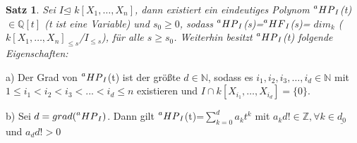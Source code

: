 \documentclass{article}
\newtheorem{satz}{Satz}
\newcommand*{\R}{k[X_{1},\ldots,X_{n}]}
\newcommand*{\indx}[2]{{#1}_{#2}}
\newcommand*{\hf}[1]{$\prescript{a}{}{HF}_{#1}$}
\newcommand*{\hp}[1]{$\prescript{a}{}{HP}_{#1}$}
\newcommand*{\kette}[2]{$1\leq {#1}_1<{#1}_2<{#1}_3<...<{#1}_{#2}\leq n$}
\newcommand*{\dkette}[2]{${#1}_1,{#1}_2,{#1}_3,\ldots,{#1}_{#2} \in \mathbb{N}$}
\newcommand*{\ideal}{$I$}
\begin{document}
\begin{satz}
	\label{1.2.14}
	Sei  \ideal $\unlhd$ $\R$, dann existiert ein eindeutiges Polynom \hp{I}(t) $\in \mathbb{Q}[t]$ (t ist eine Variable) und $\indx{s}{0}\geq0$,  sodass \hp{I}(s)=\hf{I}(s)= $\indx{dim}{k}$ ($\indx{\R}{\leq s}$/$\indx{I}{\leq s}$), für alle $ s\geq\indx{s}{0}$. Weiterhin besitzt \hp{I}(t) folgende Eigenschaften:	
\end{satz}
\begin{compactenum}
	\item[a)] Der Grad von \hp{I}(t) ist der größte $d \in \mathbb{N}$, sodass es \dkette{i}{d} mit \kette{i}{d} existieren und $I\cap k[X_{{i}_{1}},\ldots,X_{{i}_{d}}]=\{0\}$.
	\item[b)] Sei $d=grad(\textnormal{\hp{I}})$. Dann gilt \hp{I}(t)=$\sum_{k=0}^{d} \indx{a}{k}t^k$ mit $\indx{a}{k}d! \in \mathbb{Z}, \forall k\in \underline{\indx{d}{0}}$ und $\indx{a}{d}d!>0$
\end{compactenum}
\end{document}
